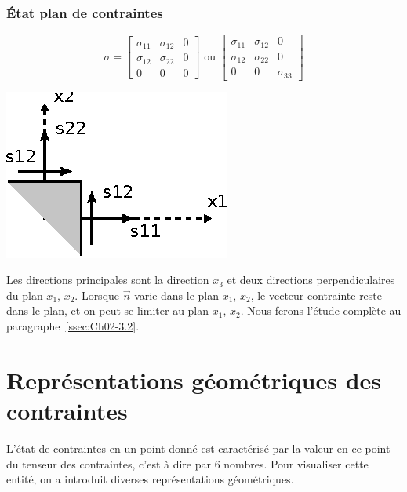 \subsubsection{État plan de contraintes}
\begin{equation}
    \mathbb{\sigma} = 
    \begin{bmatrix}
        \sigma_{11} & \sigma_{12} & 0 \\
        \sigma_{12} & \sigma_{22} & 0 \\
        0 & 0 & 0
    \end{bmatrix}
    \text{ ou }
    \begin{bmatrix}
        \sigma_{11} & \sigma_{12} & 0 \\
        \sigma_{12} & \sigma_{22} & 0 \\
        0 & 0 & \sigma_{33}
    \end{bmatrix}
    \label{eq:Ch02-022}
\end{equation}
\begin{minipage}[l]{.3\textwidth}
    \begin{center}
        \includegraphics{../images/T1_Ch02-0010}
    \end{center}
\end{minipage}
\begin{minipage}[r]{.7\textwidth}
Les directions principales sont la direction $x_3$ et deux directions perpendiculaires du plan $x_1$, $x_2$.
Lorsque $\vec{n}$ varie dans le plan $x_1$, $x_2$, le vecteur contrainte reste dans le plan, et on peut se limiter au plan $x_1$, $x_2$.
Nous ferons l'étude complète au paragraphe~\ref{ssec:Ch02-3.2}.
\end{minipage}

\section{Représentations géométriques des contraintes} \label{sec:Ch2-2}
L'état de contraintes en un point donné est caractérisé par la valeur en ce point du tenseur des contraintes, c'est à dire par 6 nombres.
Pour visualiser cette entité, on a introduit diverses représentations géométriques.
